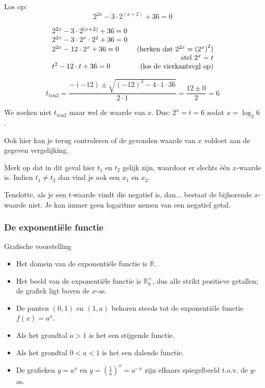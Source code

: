 \begin{voorbeeld}
Los op:  \begin{equation*}
2^{2x}-3\cdot 2^{(x+2)}+36=0
\end{equation*}

\begin{equation*}
 \begin{array}{lr}
 2^{2x}-3\cdot 2^{(x+2)}+36 = 0 & \\
	 2^{2x}-3\cdot 2^{x}\cdot 2^{2}+36 = 0 & \\
	 2^{2x}-12\cdot 2^{x}+36 = 0 & \text{ (herken dat \ensuremath{ 2^{2x}=\left(2^{x}\right)^{2}}}) \\
 	 & \text{ stel }2^{x}=t\\
	 t^{2}-12\cdot t+36 = 0 & \text{ (los de vierkantsvgl op)}
	\end{array}
\end{equation*}

\begin{equation*}
t_{1\textrm{en}2}=\frac{-(-12)\pm\sqrt{(-12)^{2}-4\cdot 1\cdot 36}}{2\cdot 1}=\frac{12\pm0}{2}=6
\end{equation*}

We zoeken niet $ t_{1\textrm{en}2}$ maar wel de waarde van $x$. Dus: $ 2^{x}=t=6$ zodat $ x=\log_{2}6$.

Ook hier kan je terug controleren of de gevonden waarde van $x$ voldoet
aan de gegeven vergelijking. 

Merk op dat in dit geval hier $ t_{1}$ en $ t_{2}$ gelijk zijn, waardoor er slechts \'e\'en $x$-waarde is. Indien $ t_{1}\neq t_{2}$ dan vind je ook een $x_{1}$ en $ x_{2}$.

Tenslotte, als je een $t$-waarde vindt die negatief is, dan... bestaat
de bijhorende $x$-waarde niet. Je kan immer geen logaritme nemen
van een negatief getal.

\end{voorbeeld}

\subsubsection{De exponenti\"ele functie}

Grafische voorstelling
\begin{itemize}
	\item Het domein van de exponenti\"ele functie is $\mathbb{R}$.
	\item Het beeld van de exponenti\"ele functie is ${\displaystyle \mathbb{R}}_{0}^{+}$,
	dus alle strikt positieve getallen; de grafiek ligt boven de $x$-as.
	\item De punten $(0,1)$ en $(1,a)$ behoren steeds tot de exponenti\"ele
	functie ${\displaystyle f(x)=a^{x}}$.
	\item Als het grondtal $a>1$ is het een stijgende functie.
	\item Als het grondtal $0<a<1$ is het een dalende functie.
	\item De grafieken ${\displaystyle y=a^{x}}$ en ${\displaystyle y=\left(\frac{1}{a}\right)^{x}=a^{-x}}$
	zijn elkaars spiegelbeeld t.o.v. de $y$-as.
\end{itemize}

